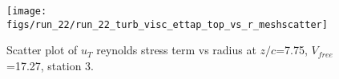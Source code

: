 \begin{figure}[H]
\centering
\texttt{[image: figs/run\_22/run\_22\_turb\_visc\_ettap\_top\_vs\_r\_meshscatter]}
\caption{Scatter plot of $
u_T$ reynolds stress term vs radius at $z/c$=7.75, $V_{free}$=17.27, station 3.}
\label{fig:run_22_turb_visc_ettap_top_vs_r_meshscatter}
\end{figure}


